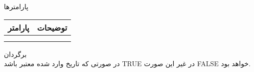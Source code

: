 پارامترها
\\
\begin{tabular}{|c|c|}
	\hline
	 پارامتر	& توضیحات \\
	\hline
	&  \\
	\hline
	&  \\
	\hline
\end{tabular}

برگردان
\\
در صورتی که تاریخ وارد شده معتبر باشد TRUE در غیر این صورت FALSE خواهد بود.

